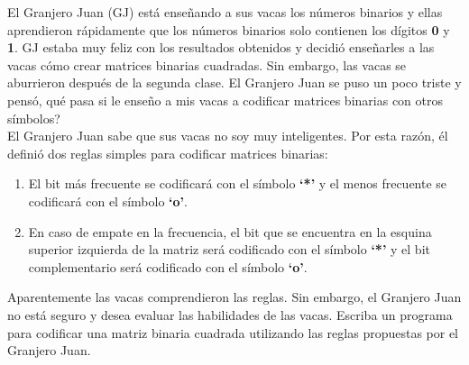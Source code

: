 %

El Granjero Juan (GJ) está enseñando a sus vacas los números binarios y ellas aprendieron rápidamente que los números binarios solo contienen los dígitos \textbf{0} y \textbf{1}. GJ estaba muy feliz con los resultados obtenidos y decidió enseñarles a las vacas cómo crear matrices binarias cuadradas. Sin embargo, las vacas se aburrieron después de la segunda clase. El Granjero Juan se puso un poco triste y pensó, qué pasa si le enseño a mis vacas a codificar matrices binarias con otros símbolos?\\

El Granjero Juan sabe que sus vacas no soy muy inteligentes. Por esta razón, él definió dos reglas simples para codificar matrices binarias:\\

\begin{enumerate}
	\item El bit más frecuente se codificará con el símbolo \textbf{`*'} y el menos frecuente se codificará con el símbolo \textbf{`o'}.
	\item En caso de empate en la frecuencia, el bit que se encuentra en la esquina superior izquierda de la matriz será codificado con el símbolo \textbf{`*'} y el bit complementario será codificado con el símbolo \textbf{`o'}.
\end{enumerate}

Aparentemente las vacas comprendieron las reglas. Sin embargo, el Granjero Juan no está seguro y desea evaluar las habilidades de las vacas. Escriba un programa para codificar una matriz binaria cuadrada utilizando las reglas propuestas por el Granjero Juan.

%
%



%
%



\sampleio
